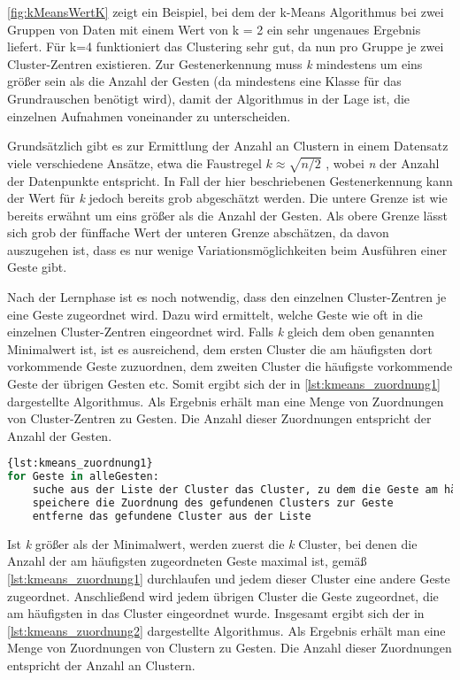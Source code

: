 \autoref{fig:kMeansWertK} zeigt ein Beispiel, bei dem der k-Means Algorithmus bei zwei Gruppen von Daten mit einem Wert von k = 2 ein sehr ungenaues Ergebnis liefert. Für k=4 funktioniert das Clustering sehr gut, da 
nun pro Gruppe je zwei Cluster-Zentren existieren.
Zur Gestenerkennung muss \emph{k} mindestens um eins größer sein als die Anzahl der Gesten (da mindestens eine Klasse für das Grundrauschen benötigt wird),
damit der Algorithmus in der Lage ist, die einzelnen Aufnahmen voneinander zu unterscheiden.  


Grundsätzlich gibt es zur Ermittlung der Anzahl an Clustern in einem Datensatz viele verschiedene Ansätze, etwa die Faustregel $k \approx \sqrt{n/2}$ \cite{WikipediaKMeansKValue}, wobei \emph{n} der Anzahl der Datenpunkte entspricht. In Fall der hier beschriebenen Gestenerkennung kann der Wert für \emph{k} jedoch bereits grob abgeschätzt werden. 
Die untere Grenze ist wie bereits erwähnt um eins größer als die Anzahl der Gesten.
Als obere Grenze lässt sich grob der fünffache Wert der unteren Grenze abschätzen, da davon auszugehen ist, dass es nur wenige Variationsmöglichkeiten beim Ausführen einer Geste gibt.

Nach der Lernphase ist es noch notwendig, dass den einzelnen Cluster-Zentren je eine Geste zugeordnet wird. Dazu wird ermittelt, welche Geste wie oft in die einzelnen Cluster-Zentren eingeordnet wird. Falls \emph{k} gleich dem oben genannten Minimalwert ist, ist es ausreichend, dem ersten Cluster die am häufigsten dort vorkommende Geste zuzuordnen, dem zweiten Cluster die häufigste vorkommende Geste der übrigen Gesten etc. 
Somit ergibt sich der in 
\autoref{lst:kmeans_zuordnung1}
dargestellte Algorithmus.
Als Ergebnis erhält man eine Menge von Zuordnungen von Cluster-Zentren zu Gesten. Die Anzahl dieser Zuordnungen entspricht der Anzahl der Gesten.

\begin{lstlisting}[language=Python,caption={Zuordnung von Cluster-Zentrum zu Geste, Variante 1},label={lst:kmeans_zuordnung1}]{lst:kmeans_zuordnung1}
for Geste in alleGesten:
    suche aus der Liste der Cluster das Cluster, zu dem die Geste am häufigsten zugeordnet wird
    speichere die Zuordnung des gefundenen Clusters zur Geste
    entferne das gefundene Cluster aus der Liste
\end{lstlisting}

Ist \emph{k} größer als der Minimalwert, werden zuerst die \emph{k} Cluster, bei denen die Anzahl der am häufigsten zugeordneten Geste maximal ist, gemäß 
\autoref{lst:kmeans_zuordnung1} durchlaufen und jedem dieser Cluster eine andere Geste zugeordnet. Anschließend wird jedem übrigen Cluster die Geste zugeordnet, die am häufigsten in das Cluster eingeordnet wurde.
Insgesamt ergibt sich der in \autoref{lst:kmeans_zuordnung2} dargestellte Algorithmus.  Als Ergebnis erhält man eine Menge von Zuordnungen von Clustern zu Gesten. Die Anzahl dieser Zuordnungen entspricht der Anzahl an Clustern.

